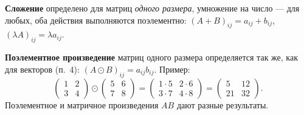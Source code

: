 \textbf{Сложение} определено для матриц \emph{одного размера}, умножение на число --- для любых, оба действия выполняются поэлементно: $(A+B)_{ij}=a_{ij}+b_{ij}$, \ $(\lambda A)_{ij}=\lambda a_{ij}$.

\textbf{Поэлементное произведение} матриц одного размера определяется так же, как для векторов (п.~4): $(A\odot B)_{ij}=a_{ij}b_{ij}$. Пример:
\[
\begin{pmatrix}1&2\\3&4\end{pmatrix}\odot\begin{pmatrix}5&6\\7&8\end{pmatrix}=\begin{pmatrix}1\cdot5&2\cdot6\\3\cdot7&4\cdot8\end{pmatrix}=\begin{pmatrix}5&12\\21&32\end{pmatrix}.
\]
Поэлементное и матричное произведения $AB$ дают разные результаты.

